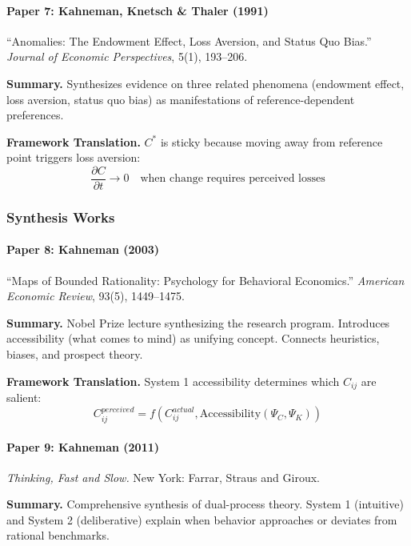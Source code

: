 \paragraph{Paper 7: Kahneman, Knetsch \& Thaler (1991)}

``Anomalies: The Endowment Effect, Loss Aversion, and Status Quo Bias.''
\textit{Journal of Economic Perspectives}, 5(1), 193--206.

\textbf{Summary.}
Synthesizes evidence on three related phenomena (endowment effect, loss aversion, 
status quo bias) as manifestations of reference-dependent preferences.

\textbf{Framework Translation.}
$C^*$ is sticky because moving away from reference point triggers loss aversion:
\begin{equation}
\frac{\partial C}{\partial t} \to 0 \quad \text{when change requires perceived losses}
\end{equation}

\subsubsection{Synthesis Works}

\paragraph{Paper 8: Kahneman (2003)}

``Maps of Bounded Rationality: Psychology for Behavioral Economics.''
\textit{American Economic Review}, 93(5), 1449--1475.

\textbf{Summary.}
Nobel Prize lecture synthesizing the research program. Introduces accessibility 
(what comes to mind) as unifying concept. Connects heuristics, biases, and 
prospect theory.

\textbf{Framework Translation.}
System 1 accessibility determines which $C_{ij}$ are salient:
\begin{equation}
C_{ij}^{perceived} = f(C_{ij}^{actual}, \text{Accessibility}(\Psi_C, \Psi_K))
\end{equation}

\paragraph{Paper 9: Kahneman (2011)}

\textit{Thinking, Fast and Slow.}
New York: Farrar, Straus and Giroux.

\textbf{Summary.}
Comprehensive synthesis of dual-process theory. System 1 (intuitive) and 
System 2 (deliberative) explain when behavior approaches or deviates from 
rational benchmarks.

